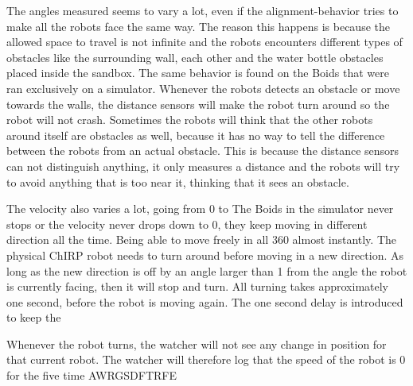 The angles measured seems to vary a lot, even if the alignment-behavior tries to make all the robots face the same way. The reason this happens is because the allowed space to travel is not infinite and the robots encounters different types of obstacles like the surrounding wall, each other and the water bottle obstacles placed inside the sandbox. The same behavior is found on the Boids that were ran exclusively on a simulator. Whenever the robots detects an obstacle or move towards the walls, the distance sensors will make the robot turn around so the robot will not crash. Sometimes the robots will think that the other robots around itself are obstacles as well, because it has no way to tell the difference between the robots from an actual obstacle. This is because the distance sensors can not distinguish anything, it only measures a distance and the robots will try to avoid anything that is too near it, thinking that it sees an obstacle.

The velocity also varies a lot, going from 0 to %
The Boids in the simulator never stops or the velocity never drops down to 0, they keep moving in different direction all the time. Being able to move freely in all 360 \textdegree almost instantly. 
The physical ChIRP robot needs to turn around before moving in a new direction. As long as the new direction is off by an angle larger than 1 \textdegree from the angle the robot is currently facing, then it will stop and turn. All turning takes approximately one second, before the robot is moving again. 
The one second delay is introduced to keep the 

Whenever the robot turns, the watcher will not see any change in position for that current robot. The watcher will therefore log that the speed of the robot is 0 for the five time AWRGSDFTRFE %

